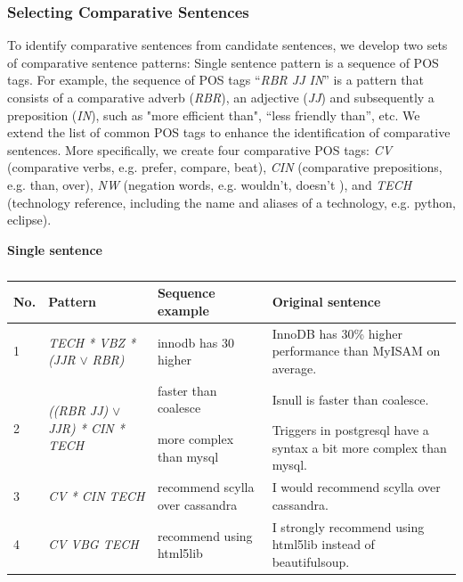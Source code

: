 \subsubsection{Selecting Comparative Sentences}
To identify comparative sentences from candidate sentences, we develop two sets of comparative sentence patterns:  
Single sentence pattern is a sequence of POS tags. 
For example, the sequence of POS tags ``\textit{RBR JJ IN}'' is a pattern that consists of a comparative adverb (\textit{RBR}), an adjective (\textit{JJ}) and subsequently a preposition (\textit{IN}), such as "more efficient than", ``less friendly than'', etc. 
We extend the list of common POS tags to enhance the identification of comparative sentences.
More specifically, we create four comparative POS tags: \textit{CV} (comparative verbs, e.g. prefer, compare, beat), \textit{CIN} (comparative prepositions, e.g. than, over), \textit{NW} (negation words, e.g. wouldn't, doesn't ), and \textit{TECH} (technology reference, including the name and aliases of a technology, e.g. python, eclipse).

\begin{table}
	\centering
	\caption{ }
	\vspace{-3mm}
\renewcommand{\arraystretch}{1.2}
	\textbf{Single sentence} 
	\begin{tabular}{l|l|l|l}
		\hline 
		\textbf{No.} & \textbf{Pattern} & \textbf{Sequence example} & \textbf{Original sentence} \\ \hline
		1 & \textit{TECH * VBZ * (JJR} $\lor$\textit{ RBR)} & innodb has 30 higher & InnoDB has 30\% higher performance than MyISAM on average. \\ \hline
		\multirow{2}{*}{2} & \multirow{2}{*}{\textit{((RBR JJ) } $\lor$\textit{ JJR) * CIN * TECH}} & faster than coalesce & Isnull is faster than coalesce. \\
		& & more complex than mysql & Triggers in postgresql have a syntax a bit more complex than mysql. \\ \hline
		3 & \textit{CV * CIN TECH} & recommend scylla over cassandra  & I would recommend scylla over cassandra. \\ \hline
		4 & \textit{CV VBG TECH} & recommend using html5lib & I strongly recommend using html5lib instead of beautifulsoup. \\
		\hline 
	\end{tabular}
	
	\vspace{-3mm}
	\label{tab:patternSingle}
\end{table}

